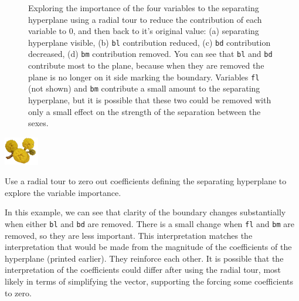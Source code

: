 \documentclass[
  letterpaper,
]{krantz}
\newcommand{\infobox}[1]{%
\noindent\colorbox{info!30}{%
\begin{minipage}{0.98\linewidth}%
    \centering%
    \begin{minipage}[c]{0.15\linewidth} %
      \includegraphics[width=1.5cm]{images/mulga-flowers2.png} %
    \end{minipage}%
    \hfill %
    \begin{minipage}[c]{0.8\linewidth} %
      \bigskip%
      \textsf{#1}%
      \bigskip%
    \end{minipage}%
    \hspace*{3mm}%
  \end{minipage}%
}%
}
\begin{document}
\begin{figure}
\begin{minipage}[t]{0.50\linewidth}
{{}

}

\end{minipage}%
%
\begin{minipage}[t]{0.50\linewidth}

{\centering 


}

\end{minipage}%

\caption{\label{fig-chinstrap-radial-pdf}Exploring the importance of the
four variables to the separating hyperplane using a radial tour to
reduce the contribution of each variable to 0, and then back to it's
original value: (a) separating hyperplane visible, (b) \texttt{bl}
contribution reduced, (c) \texttt{bd} contribution decreased, (d)
\texttt{bm} contribution removed. You can see that \texttt{bl} and
\texttt{bd} contribute most to the plane, because when they are removed
the plane is no longer on it side marking the boundary. Variables
\texttt{fl} (not shown) and \texttt{bm} contribute a small amount to the
separating hyperplane, but it is possible that these two could be
removed with only a small effect on the strength of the separation
between the sexes.}

\end{figure}

\infobox{Use a radial tour to zero out coefficients defining the separating hyperplane to explore the variable importance. 
}

In this example, we can see that clarity of the boundary changes
substantially when either \texttt{bl} and \texttt{bd} are removed. There
is a small change when \texttt{fl} and \texttt{bm} are removed, so they
are less important. This interpretation matches the interpretation that
would be made from the magnitude of the coefficients of the hyperplane
(printed earlier). They reinforce each other. It is possible that the
interpretation of the coefficients could differ after using the radial
tour, most likely in terms of simplifying the vector, supporting the
forcing some coefficients to zero.
\end{document}
